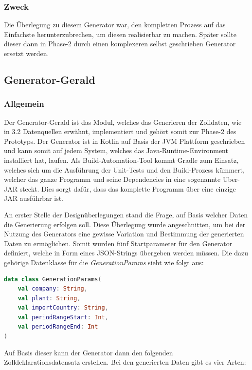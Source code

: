 \subsubsection{Zweck}
Die Überlegung zu diesem Generator war, den kompletten Prozess auf das Einfachste herunterzubrechen, um diesen realisierbar zu machen. Später sollte dieser dann in Phase-2 durch einen komplexeren selbst geschrieben Generator ersetzt werden.

\newpage
\subsection{Generator-Gerald}
\subsubsection{Allgemein}
Der Generator-Gerald ist das Modul, welches das Generieren der Zolldaten, wie in 3.2 Datenquellen erwähnt, implementiert und gehört somit zur Phase-2 des Prototyps. Der Generator ist in Kotlin auf Basis der JVM Plattform geschrieben und kann somit auf jedem System, welches das Java-Runtime-Environment installiert hat, laufen. Als Build-Automation-Tool kommt Gradle zum Einsatz, welches sich um die Ausführung der Unit-Tests und den Build-Prozess kümmert, welcher das ganze Programm und seine Dependencies in eine sogenannte Uber-JAR steckt. Dies sorgt dafür, dass das komplette Programm über eine einzige JAR ausführbar ist.
\vspace{5mm}\par
An erster Stelle der Designüberlegungen stand die Frage, auf Basis welcher Daten die Generierung erfolgen soll. Diese Überlegung wurde angeschnitten, um bei der Nutzung des Generators eine gewisse Variation und Bestimmung der generierten Daten zu ermöglichen. Somit wurden fünf Startparameter für den Generator definiert, welche in Form eines JSON-Strings übergeben werden müssen. Die dazu gehörige Datenklasse für die \textit{GenerationParams} sieht wie folgt aus:
\begin{lstlisting}[caption={GenerationParams}, language=Kotlin]
data class GenerationParams(
    val company: String,
    val plant: String,
    val importCountry: String,
    val periodRangeStart: Int,
    val periodRangeEnd: Int
)
\end{lstlisting}
\vspace{4mm}\par
Auf Basis dieser kann der Generator dann den folgenden Zolldeklarationsdatensatz erstellen.
Bei den generierten Daten gibt es vier Arten: 
